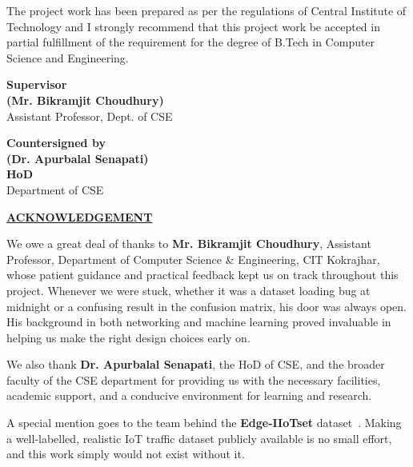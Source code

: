 \documentclass[12pt,a4paper]{report}
\begin{document}
\vspace{0.5cm}
\noindent\hspace{2em}The project work has been prepared as per the regulations of Central Institute
of Technology and I strongly recommend that this project work be accepted in partial
fulfillment of the requirement for the degree of B.Tech in Computer Science and
Engineering.

\vspace{3.5cm}
\noindent
\begin{minipage}[t]{0.45\textwidth}
\textbf{Supervisor}\\[3cm]
\textbf{(Mr. Bikramjit Choudhury)}\\
Assistant Professor, Dept. of CSE
\end{minipage}
\hfill
\begin{minipage}[t]{0.45\textwidth}
\textbf{Countersigned by}\\[3cm]
\textbf{(Dr. Apurbalal Senapati)}\\
\textbf{HoD}\\
Department of CSE
\end{minipage}

\newpage
\thispagestyle{empty}
\begin{center}
{\Large\bfseries\underline{ACKNOWLEDGEMENT}}
\end{center}
\vspace{1cm}

\noindent We owe a great deal of thanks to \textbf{Mr. Bikramjit Choudhury},
Assistant Professor, Department of Computer Science \& Engineering, CIT Kokrajhar,
whose patient guidance and practical feedback kept us on track throughout this project.
Whenever we were stuck, whether it was a dataset loading bug at midnight or a confusing
result in the confusion matrix, his door was always open. His background in both
networking and machine learning proved invaluable in helping us make the right design choices early on.

\vspace{0.5cm}
\noindent We also thank \textbf{Dr. Apurbalal Senapati}, the HoD of CSE, and the broader faculty of the CSE department for providing us with the necessary facilities, academic support, and a conducive environment for learning and research.

\vspace{0.5cm}
\noindent A special mention goes to the team behind the
\textbf{Edge-IIoTset} dataset~\cite{dataset_edge_iiotset}. Making a
well-labelled, realistic IoT traffic dataset publicly available is no small effort,
and this work simply would not exist without it.
\end{document}

